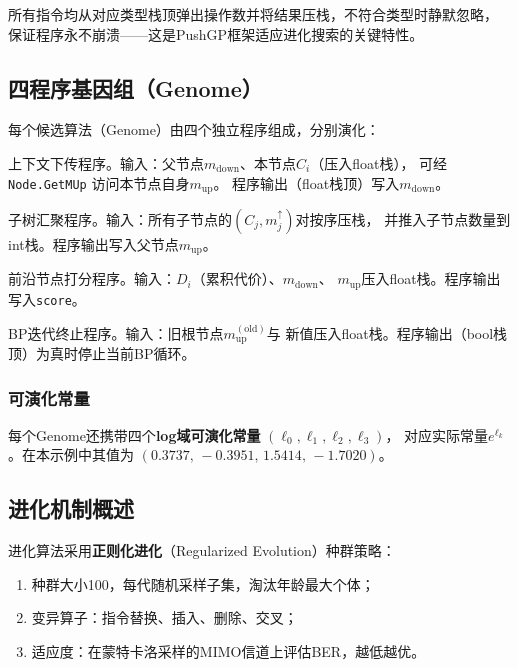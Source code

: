 \documentclass[12pt, a4paper]{ctexart}
\newcommand{\cbox}[1]{%
  \begingroup
  \setlength{\fboxsep}{4pt}%
  \colorbox{ccode}{\texttt{\small #1}}%
  \endgroup
}
\begin{document}
所有指令均从对应类型栈顶弹出操作数并将结果压栈，不符合类型时静默忽略，
保证程序永不崩溃——这是PushGP框架适应进化搜索的关键特性。

\subsection{四程序基因组（Genome）}

每个候选算法（Genome）由四个独立程序组成，分别演化：
\begin{description}[leftmargin=2em, font=\normalfont\bfseries]
  \item[$F_{\mathrm{down}}$（\texttt{prog\_down}）]
    上下文下传程序。输入：父节点$m_{\mathrm{down}}$、本节点$C_i$（压入float栈），
    可经\cbox{Node.GetMUp}访问本节点自身$m_{\mathrm{up}}$。
    程序输出（float栈顶）写入$m_{\mathrm{down}}$。
  \item[$F_{\mathrm{up}}$（\texttt{prog\_up}）]
    子树汇聚程序。输入：所有子节点的$(C_j, m_j^{\uparrow})$对按序压栈，
    并推入子节点数量到int栈。程序输出写入父节点$m_{\mathrm{up}}$。
  \item[$F_{\mathrm{belief}}$（\texttt{prog\_belief}）]
    前沿节点打分程序。输入：$D_i$（累积代价）、$m_{\mathrm{down}}$、
    $m_{\mathrm{up}}$压入float栈。程序输出写入\texttt{score}。
  \item[$H_{\mathrm{halt}}$（\texttt{prog\_halt}）]
    BP迭代终止程序。输入：旧根节点$m_{\mathrm{up}}^{\mathrm{(old)}}$与
    新值压入float栈。程序输出（bool栈顶）为真时停止当前BP循环。
\end{description}

\subsubsection{可演化常量}

每个Genome还携带四个\textbf{log域可演化常量}
$(\ell_0, \ell_1, \ell_2, \ell_3)$，
对应实际常量$e^{\ell_k}$。在本示例中其值为
$(0.3737,\,-0.3951,\,1.5414,\,-1.7020)$。

\subsection{进化机制概述}

进化算法采用\textbf{正则化进化}（Regularized Evolution）种群策略：
\begin{enumerate}[leftmargin=2em]
  \item 种群大小100，每代随机采样子集，淘汰年龄最大个体；
  \item 变异算子：指令替换、插入、删除、交叉；
  \item 适应度：在蒙特卡洛采样的MIMO信道上评估BER，越低越优。
\end{enumerate}
\end{document}
